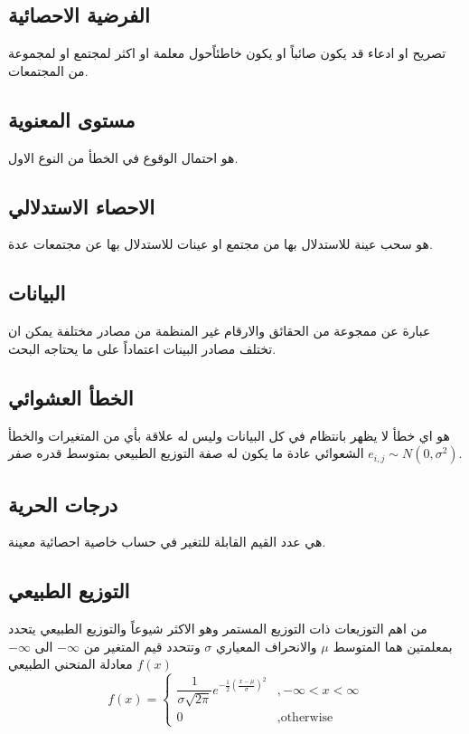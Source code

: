 \subsection{الفرضية الاحصائية}
تصريح او ادعاء قد يكون صائباً او يكون خاطئاًحول معلمة او اكثر لمجتمع او لمجموعة من المجتمعات.

\subsection{مستوى المعنوية}
هو احتمال الوقوع في الخطأ من النوع الاول.

\subsection{الاحصاء الاستدلالي}
هو سحب عينة للاستدلال بها من مجتمع او عينات للاستدلال بها عن مجتمعات عدة.

\subsection{البيانات}
عبارة عن ممجوعة من الحقائق والارقام غير المنظمة من مصادر مختلفة يمكن ان تختلف مصادر البينات اعتماداً على ما يحتاجه البحث.

\subsection{الخطأ العشوائي }
هو اي خطأ لا يظهر بانتظام في كل البيانات وليس له علاقة بأي من المتغيرات والخطأ الشعوائي عادة ما يكون له صفة التوزيع الطبيعي بمتوسط قدره صفر $e_{i,j} \sim N(0, \sigma^2)$.

\subsection{درجات الحرية}
هي عدد القيم القابلة للتغير في حساب خاصية احصائية معينة.

\subsection{التوزيع الطبيعي}
من اهم التوزيعات ذات التوزيع المستمر وهو الاكثر شيوعاً والتوزيع الطبيعي يتحدد بمعلمتين هما المتوسط $\mu$ والانحراف المعياري $\sigma$ وتتحدد قيم  المتغير من $-\infty$ الى $-\infty$ معادلة المنحني الطبيعي $f(x)$ 
\[
f(x) = 
\begin{cases}
	\dfrac{1}{\sigma\sqrt{2\pi}} e^{-\frac{1}{2}\left(\frac{x-\mu}{\sigma}\right)^2} & ,-\infty < x < \infty \\[5pt]
	0 & , \text{otherwise}
\end{cases}
\]

